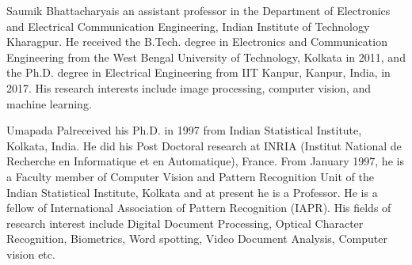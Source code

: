 \documentclass[journal]{IEEEtai}
\begin{document}
\begin{IEEEbiography}{Saumik Bhattacharya}{\space}is an assistant professor in the Department of Electronics and Electrical Communication Engineering, Indian Institute of Technology Kharagpur. He received the B.Tech. degree in Electronics and Communication Engineering from the West Bengal University of Technology, Kolkata in 2011, and the Ph.D. degree in Electrical Engineering from IIT Kanpur, Kanpur, India, in 2017. His research interests include image processing, computer vision, and machine learning.
\end{IEEEbiography}


\begin{IEEEbiography}[{\texttt{[image: up]}}]{Umapada Pal}{\space}received his Ph.D. in 1997 from Indian Statistical Institute, Kolkata, India. He did his Post Doctoral research at INRIA (Institut National de Recherche en Informatique et en Automatique), France. From January 1997, he is a Faculty member of Computer Vision and Pattern Recognition Unit of the Indian Statistical Institute, Kolkata and at present he is a Professor. He is a fellow of International Association of Pattern Recognition (IAPR). His fields of research interest include Digital Document Processing, Optical Character Recognition, Biometrics, Word spotting, Video Document Analysis, Computer vision etc.
\end{IEEEbiography}
\end{document}
